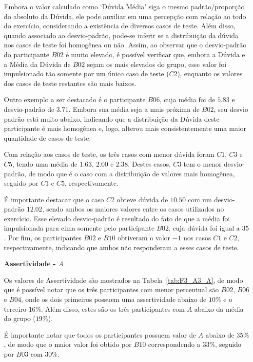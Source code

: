 Embora o valor calculado como `Dúvida Média' siga o mesmo padrão/proporção do absoluto da Dúvida, ele pode auxiliar em uma percepção com relação ao todo do exercício, considerando a existência de diversos casos de teste. Além disso, quando associado ao desvio-padrão, pode-se inferir se a distribuição da dúvida nos casos de teste foi homogênea ou não. Assim, ao observar que o desvio-padrão do participante $B02$ é muito elevado, é possível verificar que, embora a Dúvida e a Média da Dúvida de $B02$ sejam os mais elevados do grupo, esse valor foi impulsionado tão somente por um único caso de teste ($C2$), enquanto os valores dos casos de teste restantes são mais baixos.

Outro exemplo a ser destacado é o participante $B06$, cuja média foi de $5.83$ e desvio-padrão de $3.71$. Embora sua média seja a mais próxima de $B02$, seu desvio padrão está muito abaixo, indicando que a distribuição da Dúvida deste participante é mais homogênea e, logo, alterou mais consistentemente uma maior quantidade de casos de teste.

Com relação aos casos de teste, os três casos com menor dúvida foram $C1$, $C3$ e $C5$, tendo uma média de $1.63$, $2.00$ e $2.38$. Destes casos, $C3$ tem o menor desvio-padrão, de modo que é o caso com a distribuição de valores mais homogênea, seguido por $C1$ e $C5$, respectivamente.

É importante destacar que o caso $C2$ obteve dúvida de $10.50$ com um desvio-padrão $12.02$, sendo ambos os maiores valores entre os casos utilizados no exercício. Esse elevado desvio-padrão é resultado do fato de que a média foi impulsionada para cima somente pelo participante $B02$, cuja dúvida foi igual a $35$. Por fim, os participantes $B02$ e $B10$ obtiveram o valor $-1$ nos casos $C1$ e $C2$, respectivamente, indicando que ambos não responderam a esses casos de teste.

\textbf{Assertividade - $A$}

Os valores de Assertividade são mostrados na Tabela~\ref{tab:F3_A3_A}, de modo que é possível notar que os três participantes com menor percentual são $B02$, $B06$ e $B04$, onde os dois primeiros possuem uma assertividade abaixo de $10\%$ e o terceiro $16\%$. Além disso, estes são os três participantes com $A$ abaixo da média do grupo ($19\%$).

É importante notar que todos os participantes possuem valor de $A$ abaixo de $35\%$, de modo que o maior valor foi obtido por $B10$ correspondendo a $33\%$, seguido por $B03$ com $30\%$.

